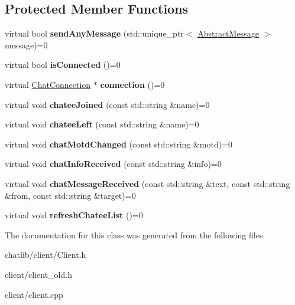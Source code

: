 \subsection*{Protected Member Functions}
\begin{DoxyCompactItemize}
\item 
\hypertarget{classSimpleChat_1_1Client_a19905e07f2ac81e2ca87d34f3c33b644}{virtual bool {\bfseries send\-Any\-Message} (std\-::unique\-\_\-ptr$<$ \hyperlink{classSimpleChat_1_1AbstractMessage}{Abstract\-Message} $>$ message)=0}\label{classSimpleChat_1_1Client_a19905e07f2ac81e2ca87d34f3c33b644}

\item 
\hypertarget{classSimpleChat_1_1Client_a4f93456c5efced8bf96daef1bb0610d3}{virtual bool {\bfseries is\-Connected} ()=0}\label{classSimpleChat_1_1Client_a4f93456c5efced8bf96daef1bb0610d3}

\item 
\hypertarget{classSimpleChat_1_1Client_aee36c38a69fe31cfb4c8d72c01ddd800}{virtual \hyperlink{classSimpleChat_1_1ChatConnection}{Chat\-Connection} $\ast$ {\bfseries connection} ()=0}\label{classSimpleChat_1_1Client_aee36c38a69fe31cfb4c8d72c01ddd800}

\item 
\hypertarget{classSimpleChat_1_1Client_add3430eee8109327eed83af837a83cb2}{virtual void {\bfseries chatee\-Joined} (const std\-::string \&name)=0}\label{classSimpleChat_1_1Client_add3430eee8109327eed83af837a83cb2}

\item 
\hypertarget{classSimpleChat_1_1Client_a53c4e72ce4e4507bfa39618ca8c8fd85}{virtual void {\bfseries chatee\-Left} (const std\-::string \&name)=0}\label{classSimpleChat_1_1Client_a53c4e72ce4e4507bfa39618ca8c8fd85}

\item 
\hypertarget{classSimpleChat_1_1Client_a5a2d88daf56fa9f4d902640de2a05cec}{virtual void {\bfseries chat\-Motd\-Changed} (const std\-::string \&motd)=0}\label{classSimpleChat_1_1Client_a5a2d88daf56fa9f4d902640de2a05cec}

\item 
\hypertarget{classSimpleChat_1_1Client_a52f9ef387936a4c4016d08b76acf01ae}{virtual void {\bfseries chat\-Info\-Received} (const std\-::string \&info)=0}\label{classSimpleChat_1_1Client_a52f9ef387936a4c4016d08b76acf01ae}

\item 
\hypertarget{classSimpleChat_1_1Client_af0f9d6bb94b8c9e298b5d096076ef4b4}{virtual void {\bfseries chat\-Message\-Received} (const std\-::string \&text, const std\-::string \&from, const std\-::string \&target)=0}\label{classSimpleChat_1_1Client_af0f9d6bb94b8c9e298b5d096076ef4b4}

\item 
\hypertarget{classSimpleChat_1_1Client_ac84496dbdb46724afb643ebbacb7e06d}{virtual void {\bfseries refresh\-Chatee\-List} ()=0}\label{classSimpleChat_1_1Client_ac84496dbdb46724afb643ebbacb7e06d}

\end{DoxyCompactItemize}


The documentation for this class was generated from the following files\-:\begin{DoxyCompactItemize}
\item 
chatlib/client/Client.\-h\item 
client/client\-\_\-old.\-h\item 
client/client.\-cpp\end{DoxyCompactItemize}
